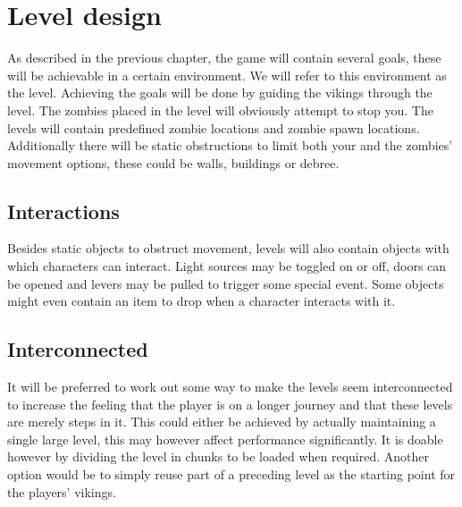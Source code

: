 \chapter{Level design}

As described in the previous chapter, the game will contain several goals, these will be achievable in a certain environment. We will refer to this environment as the level. Achieving the goals will be done by guiding the vikings through the level. The zombies placed in the level will obviously attempt to stop you. The levels will contain predefined zombie locations and zombie spawn locations. Additionally there will be static obstructions to limit both your and the zombies' movement options, these could be walls, buildings or debree.

\section{Interactions}

Besides static objects to obstruct movement, levels will also contain objects with which characters can interact. Light sources may be toggled on or off, doors can be opened and levers may be pulled to trigger some special event. Some objects might even contain an item to drop when a character interacts with it.

\section{Interconnected}

It will be preferred to work out some way to make the levels seem interconnected to increase the feeling that the player is on a longer journey and that these levels are merely steps in it. This could either be achieved by actually maintaining a single large level, this may however affect performance significantly. It is doable however by dividing the level in chunks to be loaded when required. Another option would be to simply reuse part of a preceding level as the starting point for the players' vikings.